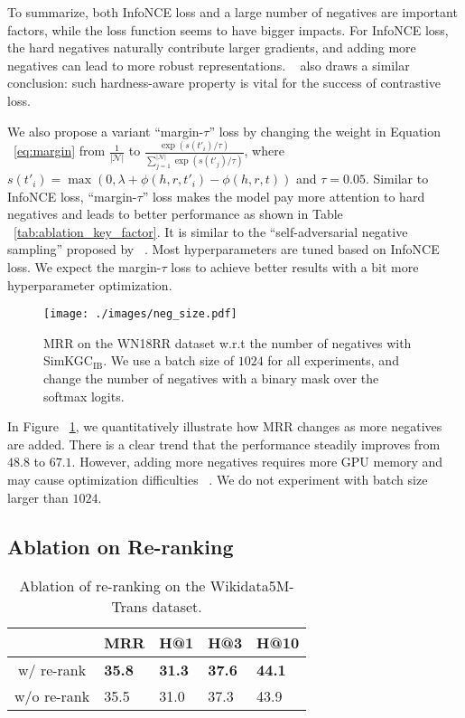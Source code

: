 \documentclass[11pt]{article}
\begin{document}
To summarize,
both InfoNCE loss and a large number of negatives are important factors,
while the loss function seems to have bigger impacts.
For InfoNCE loss,
the hard negatives naturally contribute larger gradients,
and adding more negatives can lead to more robust representations.
~\citet{Wang2021UnderstandingTB} also draws a similar conclusion:
such hardness-aware property is vital for the success of contrastive loss.

We also propose a variant ``margin-$\tau$'' loss
by changing the weight in Equation ~\ref{eq:margin} from $\frac{1}{|\mathcal{N}|}$
to $\frac{\exp(s(t'_i)/\tau)}{\sum_{j=1}^{|\mathcal{N}|}\exp(s(t'_j)/\tau)}$,
where $s(t'_i) = \max(0, \lambda + \phi(h,r,t'_i) - \phi(h,r,t))$
and $\tau = 0.05$.
Similar to InfoNCE loss,
``margin-$\tau$'' loss makes the model pay more attention to hard negatives
and leads to better performance as shown in Table ~\ref{tab:ablation_key_factor}.
It is similar to the ``self-adversarial negative sampling'' proposed by ~\citet{sun2018rotate}.
Most hyperparameters are tuned based on InfoNCE loss.
We expect the margin-$\tau$ loss to achieve better results with a bit more hyperparameter optimization.

\begin{figure}[ht]
\begin{center}
 \texttt{[image: ./images/neg\_size.pdf]}
 \caption{MRR on the WN18RR dataset w.r.t the number of negatives with SimKGC$_\text{IB}$.
 We use a batch size of $1024$ for all experiments,
 and change the number of negatives with a binary mask over the softmax logits.}
 \label{fig:neg_size}
\end{center}
\end{figure}

In Figure ~\ref{fig:neg_size},
we quantitatively illustrate how MRR changes as more negatives are added.
There is a clear trend that
the performance steadily improves from $48.8$ to $67.1$.
However,
adding more negatives requires more GPU memory
and may cause optimization difficulties ~\citep{You2020LargeBO,chen2020simple}.
We do not experiment with batch size larger than $1024$.

\subsection{Ablation on Re-ranking}

\begin{table}[ht]
\centering
\begin{tabular}{c|llll}
\hline
 & MRR & H@1 & H@3 & H@10 \\ \hline
w/ re-rank &  \textbf{35.8} & \textbf{31.3} & \textbf{37.6} & \textbf{44.1} \\
w/o re-rank & 35.5 & 31.0 & 37.3 & 43.9 \\ \hline
\end{tabular}
\caption{Ablation of re-ranking on the Wikidata5M-Trans dataset.}
\label{tab:re-rank}
\end{table}
\end{document}

